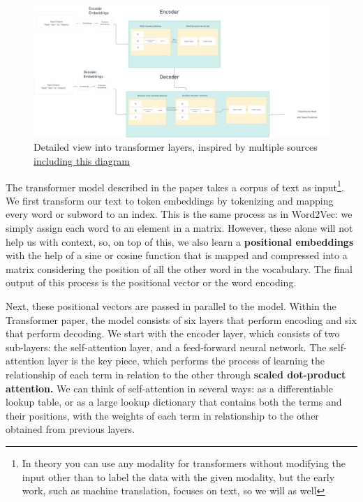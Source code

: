\documentclass[11pt, table]{diazessay} %
\begin{document}
\begin{sloppypar}
\begin{figure}[H]
\centering
\includegraphics[width=.9\textwidth]{figures/transformer_v.png}
\caption{Detailed view into transformer layers, inspired by multiple sources \href{https://lilianweng.github.io/posts/2018-06-24-attention/}{including this diagram } }
\end{figure}

The transformer model described in the paper takes a corpus of text as input\footnote{In theory you can use any modality for transformers without modifying the input other than to label the data with the given modality\citep{xu2023multimodal}, but the early work, such as machine translation, focuses on text, so we will as well}. We first transform our text to token embeddings by tokenizing and mapping every word or subword to an index. This is the same process as in Word2Vec: we simply assign each word to an element in a matrix. However, these alone will not help us with context, so, on top of this, we also learn a \textbf{positional embeddings} with the help of a sine or cosine function that is mapped and compressed into a matrix considering the position of all the other word in the vocabulary. The final output of this process is the positional vector or the word encoding. 

Next, these positional vectors are passed in parallel to the model. Within the Transformer paper, the model consists of six layers that perform encoding and six that perform decoding. We start with the encoder layer, which consists of two sub-layers: the self-attention layer, and a feed-forward neural network. The self-attention layer is the key piece, which performs the process of learning the relationship of each term in relation to the other through \textbf{scaled dot-product attention.} We can think of self-attention in several ways: as a differentiable lookup table, or as a large lookup dictionary that contains both the terms and their positions, with the weights of each term in relationship to the other obtained from previous layers. 


\end{sloppypar}
\end{document}
